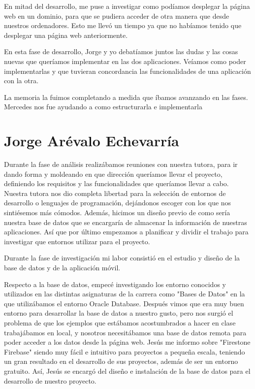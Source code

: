 En mitad del desarrollo, me puse a investigar como podíamos desplegar la página web en un dominio, para que se pudiera acceder de otra manera que desde nuestros ordenadores. Esto me llevó un tiempo ya que no habíamos tenido que desplegar una página web anteriormente.

En esta fase de desarrollo, Jorge y yo debatíamos juntos las dudas y las cosas nuevas que queríamos implementar en las dos aplicaciones. Veíamos como poder implementarlas y que tuvieran concordancia las funcionalidades de una aplicación con la otra.

La memoria la fuimos completando a medida que íbamos avanzando en las fases. Mercedes nos fue ayudando a como estructurarla e implementarla

\section*{Jorge Arévalo Echevarría}

Durante la fase de análisis realizábamos reuniones con nuestra tutora, para ir dando forma y moldeando en que dirección queríamos llevar el proyecto, definiendo los requisitos y las funcionalidades que queríamos llevar a cabo. Nuestra tutora nos dio completa libertad para la selección de entornos de desarrollo o lenguajes de programación, dejándonos escoger con los que nos sintiésemos más cómodos. Además, hicimos un diseño previo de como sería nuestra base de datos que se encargaría de almacenar la información de nuestras aplicaciones. Así que por último empezamos a planificar y dividir el trabajo para investigar que entornos utilizar para el proyecto.

Durante la fase de investigación mi labor consistió en el estudio y diseño de la base de datos y de la aplicación móvil.

Respecto a la base de datos, empecé investigando los entorno conocidos y utilizados en las distintas asignaturas de la carrera como "Bases de Datos" en la que utilizábamos el entorno Oracle Database. Después vimos que era muy buen entorno para desarrollar la base de datos a nuestro gusto, pero nos surgió el problema de que los ejemplos que estábamos acostumbrados a hacer en clase trabajábamos en local, y nosotros necesitábamos una base de datos remota para poder acceder a los datos desde la página web. Jesús me informo sobre "Firestone Firebase" siendo muy fácil e intuitivo para proyectos a pequeña escala, teniendo un gran resultado en el desarrollo de sus proyectos, además de ser un entorno gratuito. Así, Jesús se encargó del diseño e instalación de la base de datos para el desarrollo de nuestro proyecto.


